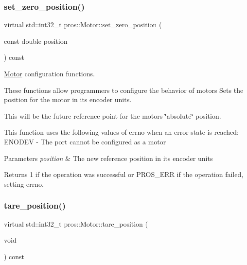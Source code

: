 \subsubsection{\texorpdfstring{set\+\_\+zero\+\_\+position()}{set\_zero\_position()}}
{\footnotesize\ttfamily virtual std\+::int32\+\_\+t pros\+::\+Motor\+::set\+\_\+zero\+\_\+position (\begin{DoxyParamCaption}\item[{const double}]{position }\end{DoxyParamCaption}) const\hspace{0.3cm}{\ttfamily [virtual]}}



\hyperlink{classpros_1_1Motor}{Motor} configuration functions. 

These functions allow programmers to configure the behavior of motors Sets the position for the motor in its encoder units.

This will be the future reference point for the motor\textquotesingle{}s \char`\"{}absolute\char`\"{} position.

This function uses the following values of errno when an error state is reached\+: E\+N\+O\+D\+EV -\/ The port cannot be configured as a motor


\begin{DoxyParams}{Parameters}
{\em position} & The new reference position in its encoder units\\
\hline
\end{DoxyParams}
\begin{DoxyReturn}{Returns}
1 if the operation was successful or P\+R\+O\+S\+\_\+\+E\+RR if the operation failed, setting errno. 
\end{DoxyReturn}
\mbox{\label{classpros_1_1Motor_a5d67803a65fa699a169a4ed5a107a964}} 
\subsubsection{\texorpdfstring{tare\+\_\+position()}{tare\_position()}}
{\footnotesize\ttfamily virtual std\+::int32\+\_\+t pros\+::\+Motor\+::tare\+\_\+position (\begin{DoxyParamCaption}\item[{void}]{ }\end{DoxyParamCaption}) const\hspace{0.3cm}{\ttfamily [virtual]}}



